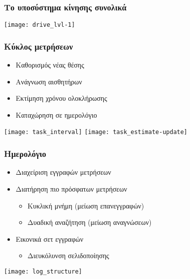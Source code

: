 \documentclass[xetex,mathserif,serif]{beamer}
\begin{document}



\begin{frame}\frametitle
    {Το υποσύστημα κίνησης συνολικά}

    \begin{center}
    \texttt{[image: drive\_lvl-1]}
    \end{center}
\end{frame}


\begin{frame}
    \frametitle{Κύκλος μετρήσεων}
    \begin{itemize}
    
    \item Καθορισμός νέας θέσης
    \item Ανάγνωση αισθητήρων
    \item Εκτίμηση χρόνου ολοκλήρωσης
    \item Καταχώρηση σε ημερολόγιο
    \end{itemize}

    \begin{center}
        \texttt{[image: task\_interval]}
        \hfill
        \texttt{[image: task\_estimate-update]}
    \end{center}
\end{frame}


\begin{frame}
    \frametitle{Ημερολόγιο}
    \begin{itemize}
    \item Διαχείριση εγγραφών μετρήσεων
    \item Διατήρηση πιο πρόσφατων μετρήσεων
        \begin{itemize}
        \item Κυκλική μνήμη (μείωση επανεγγραφών)
        \item Δυαδική αναζήτηση (μείωση αναγνώσεων)
        \end{itemize}
    \item Εικονικά σετ εγγραφών
        \begin{itemize}
            \item Διευκόλυνση σελιδοποίησης
        \end{itemize}
    \end{itemize}
    \begin{center}
        \texttt{[image: log\_structure]}
    \end{center}
\end{frame}
\end{document}
